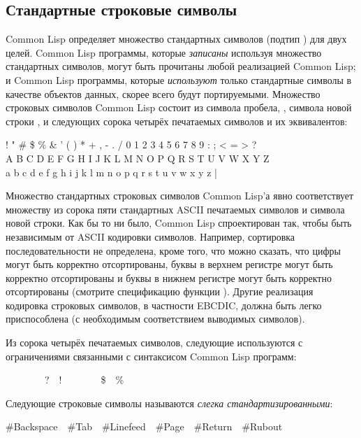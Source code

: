 \subsection{Стандартные строковые символы}

Common Lisp определяет множество стандартных символов (подтип
) для двух целей.
Common Lisp программы, которые \emph{записаны} используя множество стандартных
символов, могут быть прочитаны любой реализацией Common Lisp; и Common Lisp
программы, которые \emph{используют} только стандартные символы в качестве
объектов данных, скорее всего будут портируемыми. Множество строковых символов
Common Lisp состоит из символа пробела, , символа
новой строки , и следующих сорока четырёх печатаемых
символов и их эквивалентов:
\begin{lisp}
! " \# \$ \% \& ' ( ) * + , - . / 0 1 2 3 4 5 6 7 8 9 : ; < = > ? \\
{\Xatsign} A B C D E F G H I J K L M N O P Q R S T U V W X Y Z {\Xlbracket} {\Xbackslash} {\Xrbracket} {\Xcircumflex} {\Xunderscore} \\
{\Xbq} a b c d e f g h i j k l m n o p q r s t u v w x y z {\Xlbrace} | {\Xrbrace} {\Xtilde}
\end{lisp}

Множество стандартных строковых символов Common Lisp'а явно соответствует
множеству из сорока пяти стандартных ASCII печатаемых символов и символа новой
строки. Как бы то ни было, Common Lisp спроектирован так, чтобы быть независимым
от ASCII кодировки символов. Например, сортировка последовательности не
определена, кроме того, что можно сказать, что цифры могут быть корректно
отсортированы, буквы в верхнем регистре могут быть корректно отсортированы и
буквы в нижнем регистре могут быть корректно отсортированы (смотрите
спецификацию функции ). Другие реализация кодировка строковых
символов, в частности EBCDIC, должна быть легко приспособлена (с необходимым
соответствием выводимых символов).

Из сорока четырёх печатаемых символов, следующие используются с ограничениями
связанными с синтаксисом Common Lisp программ:
\begin{lisp}
{\Xlbracket}~~{\Xrbracket}~~{\Xlbrace}~~{\Xrbrace}~~?~~!~~{\Xcircumflex}~~{\Xunderscore}~~{\Xtilde}~~\$~~\% 
\end{lisp}

Следующие строковые символы называются \emph{слегка стандартизированными}:
\begin{lisp}
\#{\Xbackslash}Backspace~~\#{\Xbackslash}Tab~~\#{\Xbackslash}Linefeed~~\#{\Xbackslash}Page~~\#{\Xbackslash}Return~~\#{\Xbackslash}Rubout
\end{lisp}

